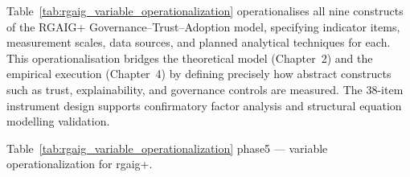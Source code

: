 \vspace{1.5em}


Table~\ref{tab:rgaig_variable_operationalization} operationalises all nine constructs of the RGAIG+ Governance--Trust--Adoption model, specifying indicator items, measurement scales, data sources, and planned analytical techniques for each. This operationalisation bridges the theoretical model (Chapter~2) and the empirical execution (Chapter~4) by defining precisely how abstract constructs such as trust, explainability, and governance controls are measured. The 38-item instrument design supports confirmatory factor analysis and structural equation modelling validation.

\begingroup\singlespacing\tablefontsize\tablestripes
\noindent Table~\ref{tab:rgaig_variable_operationalization} phase5 --- variable operationalization for rgaig+.

